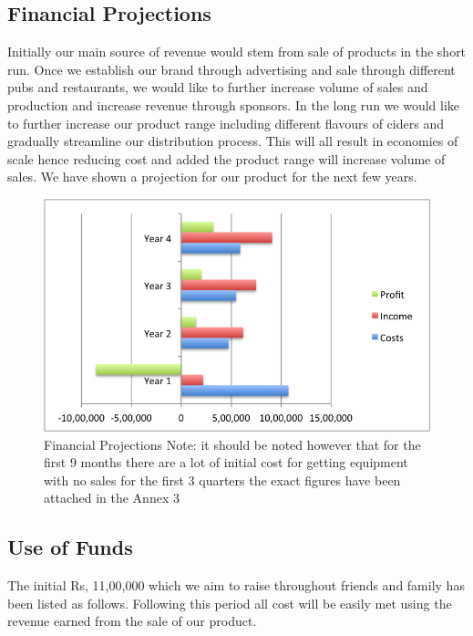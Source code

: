 \documentclass[11pt]{article}
\begin{document}
  \subsection{Financial Projections}
Initially our main source of revenue would stem from sale of products in the
short run. Once we establish our brand through advertising and sale through
different pubs and restaurants, we would like to further increase volume of
sales and production and increase revenue through sponsors. In the long run we
would like to further increase our product range including different flavours
of ciders and gradually streamline our distribution process. This will all
result in economies of scale hence reducing cost and added the product range
will increase volume of sales. We have shown a projection for our product for
the next few years.

	\begin{figure}[H]
	\caption{Financial Projections \newline Note: it should be noted however that
for the first 9 months there are a lot of initial cost for getting equipment
with no sales for the first 3 quarters \newline the exact figures have been
attached in the Annex 3}
	\centering
	\includegraphics[width=\textwidth]{financialProjections.png}
	\end{figure}

  \subsection{Use of Funds}
The initial Rs, 11,00,000 which we aim to raise throughout friends and family
has been listed as follows. Following this period all cost will be easily met
using the revenue earned from the sale of our product.
\end{document}
